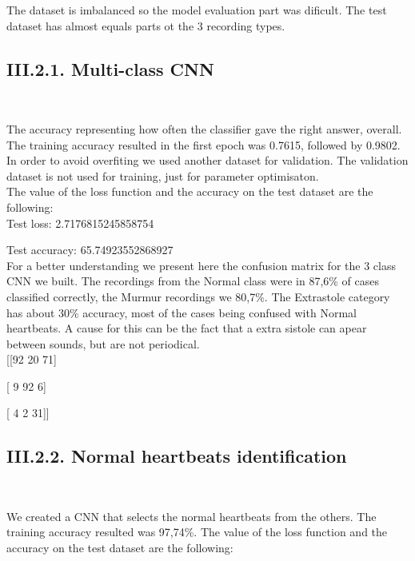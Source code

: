 \documentclass[11pt, a4papper]{report}
\theoremstyle{plain}
\theoremstyle{definition}
\theoremstyle{definition}
\theoremstyle{proposition}
\begin{document}
The dataset is imbalanced so the model evaluation part was dificult. The test dataset has almost equals parts ot the 3 recording types. 
\newpage

\subsection*{III.2.1. Multi-class CNN}

\

The accuracy representing how often the classifier gave the right answer, overall. The training accuracy resulted in the first epoch was 0.7615, followed by 0.9802. In order to avoid overfiting we used another dataset for validation. The validation dataset is not used for training, just for parameter optimisaton.
\\

The value of the loss function and the accuracy on the test dataset are the following:
\\

Test loss: 2.7176815245858754
\

Test accuracy: 65.74923552868927
\\

For a better understanding we present here the confusion matrix for the 3 class CNN we built. The recordings from the Normal class were in 87,6\% of cases classified correctly, the Murmur recordings we 80,7\%. The Extrastole category has about 30\% accuracy, most of the cases being confused with Normal heartbeats. A cause for this can be the fact that a extra sistole can apear between sounds, but are not periodical.
\\

[[92 20 71]
\

 [ 9 92  6]
 \
 
 [ 4  2 31]]
\\

\subsection*{III.2.2. Normal heartbeats identification}

\

We created a CNN that selects the normal heartbeats from the others. The training accuracy resulted was 97,74\%. The value of the loss function and the accuracy on the test dataset are the following:
\\
\end{document}
